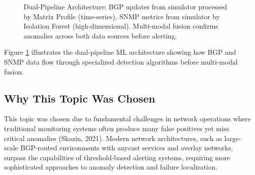\documentclass[11pt]{article}
\begin{document}
\begin{figure}[h]
{
}
\caption{Dual-Pipeline Architecture: BGP updates from simulator processed by Matrix Profile (time-series), SNMP metrics from simulator by Isolation Forest (high-dimensional). Multi-modal fusion confirms anomalies across both data sources before alerting.}
\label{fig:architecture}
\end{figure}

Figure \ref{fig:architecture} illustrates the dual-pipeline ML architecture showing how BGP and SNMP data flow through specialized detection algorithms before multi-modal fusion.

\subsection{Why This Topic Was Chosen}

This topic was chosen due to fundamental challenges in network operations where traditional monitoring systems often produce many false positives yet miss critical anomalies (Skazin, 2021). Modern network architectures, such as large-scale BGP-routed environments with anycast services and overlay networks, surpass the capabilities of threshold-based alerting systems, requiring more sophisticated approaches to anomaly detection and failure localization.
\end{document}
